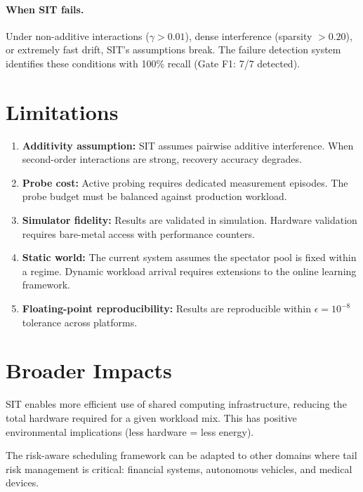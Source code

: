 \documentclass[11pt,twocolumn]{article}
\begin{document}
\paragraph{When SIT fails.}
Under non-additive interactions ($\gamma > 0.01$), dense interference
(sparsity $> 0.20$), or extremely fast drift, SIT's assumptions break.
The failure detection system identifies these conditions with 100\%
recall (Gate F1: 7/7 detected).

\section{Limitations}

\begin{enumerate}
\item \textbf{Additivity assumption:} SIT assumes pairwise additive
interference. When second-order interactions are strong, recovery
accuracy degrades.

\item \textbf{Probe cost:} Active probing requires dedicated measurement
episodes. The probe budget must be balanced against production workload.

\item \textbf{Simulator fidelity:} Results are validated in simulation.
Hardware validation requires bare-metal access with performance counters.

\item \textbf{Static world:} The current system assumes the spectator
pool is fixed within a regime. Dynamic workload arrival requires
extensions to the online learning framework.

\item \textbf{Floating-point reproducibility:} Results are reproducible
within $\epsilon = 10^{-8}$ tolerance across platforms.
\end{enumerate}

\section{Broader Impacts}

SIT enables more efficient use of shared computing infrastructure,
reducing the total hardware required for a given workload mix. This
has positive environmental implications (less hardware = less energy).

The risk-aware scheduling framework can be adapted to other domains
where tail risk management is critical: financial systems, autonomous
vehicles, and medical devices.
\end{document}
